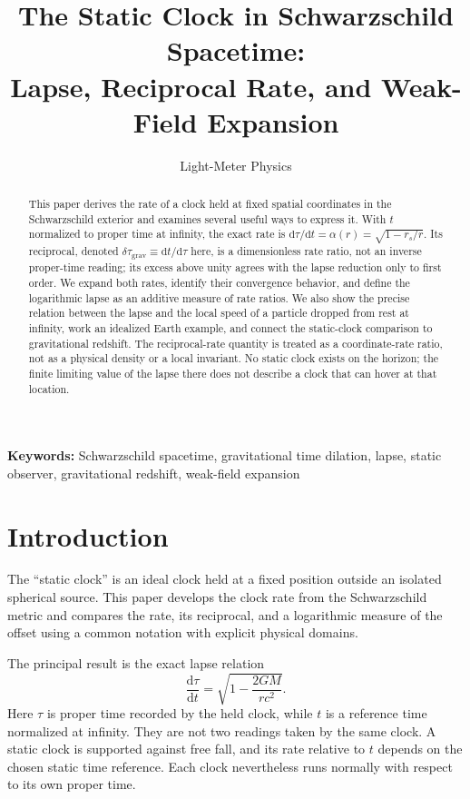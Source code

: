 \documentclass[12pt]{article}
\title{The Static Clock in Schwarzschild Spacetime:\\
Lapse, Reciprocal Rate, and Weak-Field Expansion}
\author{Light-Meter Physics}
\date{}
\begin{document}
\maketitle

\begin{abstract}
This paper derives the rate of a clock held at fixed spatial coordinates in the Schwarzschild exterior and examines several useful ways to express it. With $t$ normalized to proper time at infinity, the exact rate is $\mathrm{d}\tau/\mathrm{d}t=\alpha(r)=\sqrt{1-r_s/r}$. Its reciprocal, denoted $\delta\tau_{\mathrm{grav}}\equiv\mathrm{d}t/\mathrm{d}\tau$ here, is a dimensionless rate ratio, not an inverse proper-time reading; its excess above unity agrees with the lapse reduction only to first order. We expand both rates, identify their convergence behavior, and define the logarithmic lapse as an additive measure of rate ratios. We also show the precise relation between the lapse and the local speed of a particle dropped from rest at infinity, work an idealized Earth example, and connect the static-clock comparison to gravitational redshift. The reciprocal-rate quantity is treated as a coordinate-rate ratio, not as a physical density or a local invariant. No static clock exists on the horizon; the finite limiting value of the lapse there does not describe a clock that can hover at that location.
\end{abstract}

\noindent\textbf{Keywords:} Schwarzschild spacetime, gravitational time dilation, lapse, static observer, gravitational redshift, weak-field expansion

\section{Introduction}

The ``static clock'' is an ideal clock held at a fixed position outside an isolated spherical source. This paper develops the clock rate from the Schwarzschild metric and compares the rate, its reciprocal, and a logarithmic measure of the offset using a common notation with explicit physical domains.

The principal result is the exact lapse relation
\begin{equation*}
  \frac{\mathrm{d}\tau}{\mathrm{d}t}
  =\sqrt{1-\frac{2GM}{rc^2}}.
\end{equation*}
Here $\tau$ is proper time recorded by the held clock, while $t$ is a reference time normalized at infinity. They are not two readings taken by the same clock. A static clock is supported against free fall, and its rate relative to $t$ depends on the chosen static time reference. Each clock nevertheless runs normally with respect to its own proper time.
\end{document}
